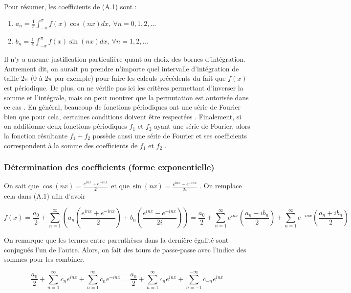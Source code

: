 Pour résumer, les coefficients de (A.1) sont : 

\begin{enumerate}
    \item $a_n = \frac{1}{\pi}\int_{-\pi}^{\pi}f(x)\cos(nx)dx,  \ \forall n=0,1,2,...$ 
    \item $b_n = \frac{1}{\pi}\int_{-\pi}^{\pi}f(x)\sin(nx)dx, \ \forall n = 1,2,...$
\end{enumerate}

Il n'y a aucune justification particulière quant au choix des bornes d'intégration. Autrement dit, on aurait pu prendre n'importe quel intervalle d'intégration de taille $2\pi$ ($0$ à $2\pi$ par exemple) pour faire les calculs précédents du fait que $f(x)$ est périodique. De plus, on ne vérifie pas ici les critères permettant d'inverser la somme et l'intégrale, mais on peut montrer que la permutation est autorisée dans ce cas \cite{kreyszig11}. En général, beaucoup de fonctions périodiques ont une série de Fourier bien que pour cela, certaines conditions doivent être respectées \cite{kreyszig11}. Finalement, si on additionne deux fonctions périodiques $f_1$ et $f_2$ ayant une série de Fourier, alors la fonction résultante $f_1 + f_2$ possède aussi une série de Fourier et ses coefficients correspondent à la somme des coefficients de $f_1$ et $f_2$ \cite{kreyszig11}.

\subsubsection*{Détermination des coefficients (forme exponentielle)}
On sait que $
     \cos(nx) = \frac{e^{inx} + e^{-inx}}{2} \ \ \text{et que} \ \sin(nx) = \frac{e^{inx} - e^{-inx}}{2i} $
. On remplace cela dans (A.1) afin d'avoir

\begin{equation*}
    f(x) = \frac{a_0}{2} + \sum_{n=1}^{\infty} \left(a_n \left(\frac{e^{inx} + e^{-inx}}{2}\right) + b_n \left(\frac{e^{inx} - e^{-inx}}{2i}\right)\right) = \frac{a_0}{2} + \sum_{n=1}^{\infty} e^{inx}\left(\frac{a_n - ib_n}{2} \right) + \sum_{n=1}^{\infty}e^{-inx} \left(\frac{a_n + ib_n}{2}\right)
\end{equation*}

On remarque que les termes entre parenthèses dans la dernière égalité sont conjugués l'un de l'autre. Alors, on fait des tours de passe-passe avec l'indice des sommes pour les combiner.

\begin{equation*}
    \frac{a_0}{2} + \sum_{n=1}^{\infty} c_n e^{inx} + \sum_{n=1}^{\infty} \bar{c}_n e^{-inx} = \frac{a_0}{2} + \sum_{n=1}^{\infty}c_{n}e^{inx} + \sum_{n=-1}^{-\infty} \bar{c}_{-n} e^{inx} 
\end{equation*} 

